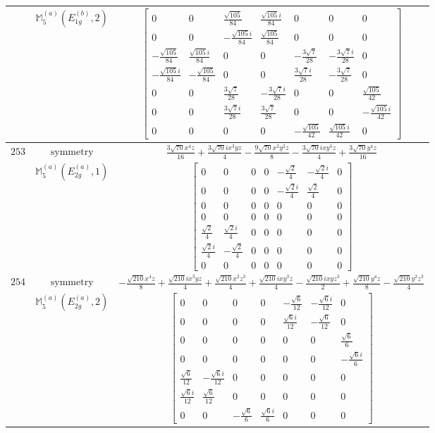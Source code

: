 \documentclass[fleqn,8pt,landscape]{jsarticle}
\begin{document}
\begin{longtable}{ccc}
$  $ & $ \mathbb{M}_{5}^{(a)}(E_{1g}^{(b)},2) $ & $ \begin{bmatrix} 0 & 0 & \frac{\sqrt{105}}{84} & \frac{\sqrt{105} i}{84} & 0 & 0 & 0 \\ 0 & 0 & - \frac{\sqrt{105} i}{84} & \frac{\sqrt{105}}{84} & 0 & 0 & 0 \\ - \frac{\sqrt{105}}{84} & \frac{\sqrt{105} i}{84} & 0 & 0 & - \frac{3 \sqrt{7}}{28} & - \frac{3 \sqrt{7} i}{28} & 0 \\ - \frac{\sqrt{105} i}{84} & - \frac{\sqrt{105}}{84} & 0 & 0 & \frac{3 \sqrt{7} i}{28} & - \frac{3 \sqrt{7}}{28} & 0 \\ 0 & 0 & \frac{3 \sqrt{7}}{28} & - \frac{3 \sqrt{7} i}{28} & 0 & 0 & \frac{\sqrt{105}}{42} \\ 0 & 0 & \frac{3 \sqrt{7} i}{28} & \frac{3 \sqrt{7}}{28} & 0 & 0 & - \frac{\sqrt{105} i}{42} \\ 0 & 0 & 0 & 0 & - \frac{\sqrt{105}}{42} & \frac{\sqrt{105} i}{42} & 0 \end{bmatrix} $ \\ \hline
$ 253 $ & $ \text{symmetry} $ & $ \frac{3 \sqrt{70} x^{4} z}{16} + \frac{3 \sqrt{70} i x^{3} y z}{4} - \frac{9 \sqrt{70} x^{2} y^{2} z}{8} - \frac{3 \sqrt{70} i x y^{3} z}{4} + \frac{3 \sqrt{70} y^{4} z}{16} $ \\
$  $ & $ \mathbb{M}_{5}^{(a)}(E_{2g}^{(a)},1) $ & $ \begin{bmatrix} 0 & 0 & 0 & 0 & - \frac{\sqrt{2}}{4} & - \frac{\sqrt{2} i}{4} & 0 \\ 0 & 0 & 0 & 0 & - \frac{\sqrt{2} i}{4} & \frac{\sqrt{2}}{4} & 0 \\ 0 & 0 & 0 & 0 & 0 & 0 & 0 \\ 0 & 0 & 0 & 0 & 0 & 0 & 0 \\ \frac{\sqrt{2}}{4} & \frac{\sqrt{2} i}{4} & 0 & 0 & 0 & 0 & 0 \\ \frac{\sqrt{2} i}{4} & - \frac{\sqrt{2}}{4} & 0 & 0 & 0 & 0 & 0 \\ 0 & 0 & 0 & 0 & 0 & 0 & 0 \end{bmatrix} $ \\ \hline
$ 254 $ & $ \text{symmetry} $ & $ - \frac{\sqrt{210} x^{4} z}{8} + \frac{\sqrt{210} i x^{3} y z}{4} + \frac{\sqrt{210} x^{2} z^{3}}{4} + \frac{\sqrt{210} i x y^{3} z}{4} - \frac{\sqrt{210} i x y z^{3}}{2} + \frac{\sqrt{210} y^{4} z}{8} - \frac{\sqrt{210} y^{2} z^{3}}{4} $ \\
$  $ & $ \mathbb{M}_{5}^{(a)}(E_{2g}^{(a)},2) $ & $ \begin{bmatrix} 0 & 0 & 0 & 0 & - \frac{\sqrt{6}}{12} & - \frac{\sqrt{6} i}{12} & 0 \\ 0 & 0 & 0 & 0 & \frac{\sqrt{6} i}{12} & - \frac{\sqrt{6}}{12} & 0 \\ 0 & 0 & 0 & 0 & 0 & 0 & \frac{\sqrt{6}}{6} \\ 0 & 0 & 0 & 0 & 0 & 0 & - \frac{\sqrt{6} i}{6} \\ \frac{\sqrt{6}}{12} & - \frac{\sqrt{6} i}{12} & 0 & 0 & 0 & 0 & 0 \\ \frac{\sqrt{6} i}{12} & \frac{\sqrt{6}}{12} & 0 & 0 & 0 & 0 & 0 \\ 0 & 0 & - \frac{\sqrt{6}}{6} & \frac{\sqrt{6} i}{6} & 0 & 0 & 0 \end{bmatrix} $ \\ \hline

\end{longtable}
\end{document}
